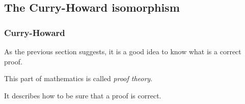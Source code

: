 \documentclass{beamer}
\begin{document}


      

    

\subsection[Curry-Howard]{The Curry-Howard isomorphism}
\label{sec:curry-howard-isom}

\begin{frame}
  \frametitle{Curry-Howard}
  
  As the previous section suggests, it is a good idea to know what is
  a correct proof.

  \vspace{2em}
  This part of mathematics is called {\em proof theory}.

  \vspace{2em}
  It describes how to be sure that a proof is correct.
\end{frame}
\end{document}
